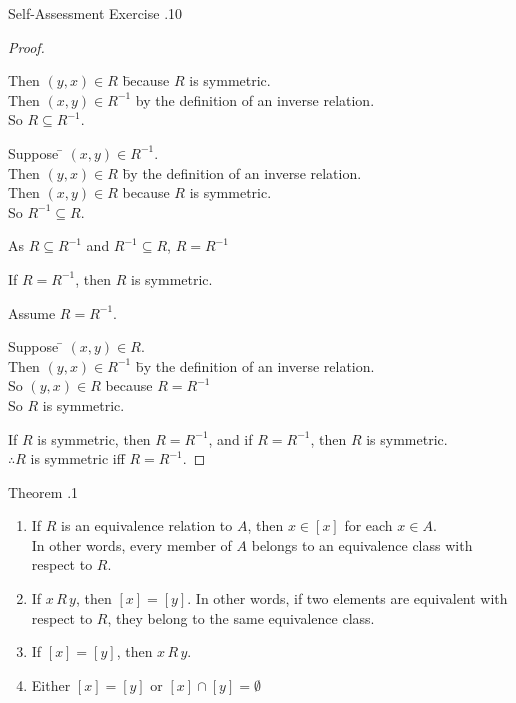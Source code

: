 \documentclass[\main/notes.tex]{subfiles}
\begin{document}
\begin{exercise}{Self-Assessment Exercise \thechapter.10}
\begin{questions}
\begin{answer}
\begin{proof}
\begin{questions}[label=(\roman*)]
\begin{subproof}
\begin{tabbing}
													Then \> $(y, x) \in R$ \quad \=because $R$ is symmetric.\\
													Then \> $(x, y) \in R^{-1}$ \>by the definition of an inverse relation.\\
													So \>$R \subseteq R^{-1}$.
												\end{tabbing}
												\begin{tabbing}
													Suppose \quad \= $(x, y) \in R^{-1}$.\\
													Then \> $(y, x) \in R$ \quad \=by the definition of an inverse relation.\\
													Then \> $(x, y) \in R$ \>because $R$ is symmetric.\\
													So \>$R^{-1} \subseteq R$.
												\end{tabbing}
												As $R \subseteq R^{-1}$ and $R^{-1} \subseteq R$, $R = R^{-1}$
											\end{subproof}
										\item If $R = R^{-1}$, then $R$ is symmetric.
											\begin{subproof}
												Assume $R = R^{-1}$.
												\begin{tabbing}
													Suppose \quad \= $(x, y) \in R$.\\
													Then \>$(y, x) \in R^{-1}$ \quad \= by the definition of an inverse relation.\\
													So \>$(y, x) \in R$ \> because $R = R^{-1}$\\
													So \> $R$ is symmetric.
												\end{tabbing}
											\end{subproof}
									\end{questions}
									If $R$ is symmetric, then $R = R^{-1}$, and if $R = R^{-1}$, then $R$ is symmetric.\\
									$\therefore R$ is symmetric iff $R = R^{-1}$.
								\end{proof}
							\end{answer}
					\end{questions}
				\end{exercise}
				\pagebreak
				\begin{theorem}{Theorem \thechapter.1}
					\begin{enumerate}[label=(\roman*)]
						\item If $R$ is an equivalence relation to $A$, then $x \in [x]$ for each $x \in A$.\\
							In other words, every member of $A$ belongs to an equivalence class with respect to $R$.
						\item If $x\, R \, y$, then $[x] = [y]$. In other words, if two elements are equivalent with respect to $R$, they belong to the same equivalence class.
						\item If $[x] = [y]$, then $x \, R \, y$.
						\item Either $[x] = [y]$ or $[x] \cap [y] = \emptyset$
					\end{enumerate}
				\end{theorem}
\end{document}
